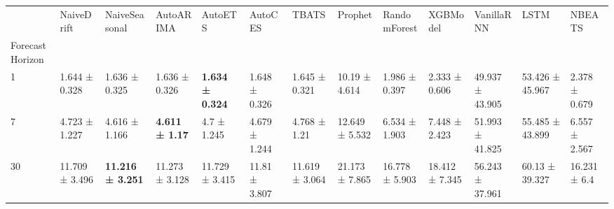 \begin{tabular}{lllllllllllll}
\toprule
 & NaiveDrift & NaiveSeasonal & AutoARIMA & AutoETS & AutoCES & TBATS & Prophet & RandomForest & XGBModel & VanillaRNN & LSTM & NBEATS \\
Forecast Horizon &  &  &  &  &  &  &  &  &  &  &  &  \\
\midrule
1 & 1.644 ± 0.328 & 1.636 ± 0.325 & 1.636 ± 0.326 & \textbf{1.634 ± 0.324} & 1.648 ± 0.326 & 1.645 ± 0.321 & 10.19 ± 4.614 & 1.986 ± 0.397 & 2.333 ± 0.606 & 49.937 ± 43.905 & 53.426 ± 45.967 & 2.378 ± 0.679 \\
7 & 4.723 ± 1.227 & 4.616 ± 1.166 & \textbf{4.611 ± 1.17} & 4.7 ± 1.245 & 4.679 ± 1.244 & 4.768 ± 1.21 & 12.649 ± 5.532 & 6.534 ± 1.903 & 7.448 ± 2.423 & 51.993 ± 41.825 & 55.485 ± 43.899 & 6.557 ± 2.567 \\
30 & 11.709 ± 3.496 & \textbf{11.216 ± 3.251} & 11.273 ± 3.128 & 11.729 ± 3.415 & 11.81 ± 3.807 & 11.619 ± 3.064 & 21.173 ± 7.865 & 16.778 ± 5.903 & 18.412 ± 7.345 & 56.243 ± 37.961 & 60.13 ± 39.327 & 16.231 ± 6.4 \\
\bottomrule
\end{tabular}
